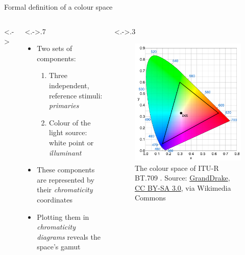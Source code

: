 \documentclass[aspectratio=169,usepdftitle=false]{fireshonks}
\begin{document}
\begin{frame}{Formal definition of a colour space}
    \begin{columns}<.->
        \begin{column}<.->{.7\textwidth}
            \begin{itemize}
                \item Two sets of components:
                      \begin{enumerate}
                          \item Three independent, reference stimuli: \emph{primaries}
                          \item Colour of the light source: white point or \emph{illuminant}
                      \end{enumerate}
                \item These components are represented by their \emph{chromaticity} coordinates
                \item Plotting them in \emph{chromaticity diagrams} reveals the space's gamut
            \end{itemize}
        \end{column}
        \begin{column}<.->{.3\textwidth}
            \begin{figure}
                \includegraphics[width=\columnwidth,keepaspectratio]{figures/bt709.pdf}
                \caption*{The colour space of ITU-R BT.709 \parencite*{BT709}. Source: \href{https://commons.wikimedia.org/wiki/File:CIExy1931_Rec_709.svg}{GrandDrake}, \href{http://creativecommons.org/licenses/by-sa/3.0/}{CC BY-SA 3.0}, via Wikimedia Commons}
            \end{figure}
        \end{column}
    \end{columns}
\end{frame}
\end{document}
